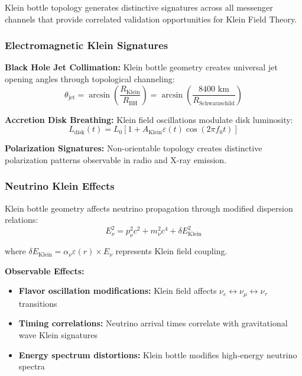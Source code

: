 \documentclass[12pt]{iopart}
\newcommand{\fzero}{f_0}
\begin{document}
Klein bottle topology generates distinctive signatures across all messenger channels that provide correlated validation opportunities for Klein Field Theory.

\subsubsection{Electromagnetic Klein Signatures}

\textbf{Black Hole Jet Collimation:} Klein bottle geometry creates universal jet opening angles through topological channeling:
\begin{equation}
\theta_{\text{jet}} = \arcsin\left(\frac{R_{\text{Klein}}}{R_{\text{BH}}}\right) = \arcsin\left(\frac{8400 \text{ km}}{R_{\text{Schwarzschild}}}\right)
\label{eq:jet_collimation}
\end{equation}

\textbf{Accretion Disk Breathing:} Klein field oscillations modulate disk luminosity:
\begin{equation}
L_{\text{disk}}(t) = L_0 \left[1 + A_{\text{Klein}} \varepsilon(t) \cos(2\pi \fzero t)\right]
\label{eq:disk_modulation}
\end{equation}

\textbf{Polarization Signatures:} Non-orientable topology creates distinctive polarization patterns observable in radio and X-ray emission.

\subsubsection{Neutrino Klein Effects}

Klein bottle geometry affects neutrino propagation through modified dispersion relations:
\begin{equation}
E_\nu^2 = p_\nu^2 c^2 + m_\nu^2 c^4 + \delta E_{\text{Klein}}^2
\label{eq:neutrino_dispersion}
\end{equation}

where $\delta E_{\text{Klein}} = \alpha_\nu \varepsilon(r) \times E_\nu$ represents Klein field coupling.

\textbf{Observable Effects:}
\begin{itemize}
\item \textbf{Flavor oscillation modifications:} Klein field affects $\nu_e \leftrightarrow \nu_\mu \leftrightarrow \nu_\tau$ transitions
\item \textbf{Timing correlations:} Neutrino arrival times correlate with gravitational wave Klein signatures
\item \textbf{Energy spectrum distortions:} Klein bottle modifies high-energy neutrino spectra
\end{itemize}
\end{document}

